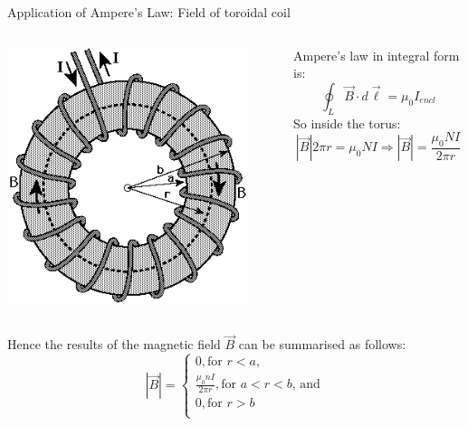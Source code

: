 \begin{frame}{Application of Ampere's Law: Field of toroidal coil}

\begin{columns}
  \begin{column}{0.33\textwidth}
    \begin{center}
     \includegraphics[width=0.90\textwidth]{./images/schematics/toroidal_coil_magnetic_field.png}\\
    \end{center}
  \end{column}
  \begin{column}{0.67\textwidth}
     Ampere's law in integral form is:
     \begin{equation*}
        \oint_{L} \vec{B} \cdot d\vec{\ell} = \mu_0 I_{encl}
     \end{equation*}
     So inside the torus:
     \begin{equation*}
         |\vec{B}| 2\pi r = \mu_0 N I \Rightarrow  |\vec{B}| = \frac{\mu_0 N I}{2\pi r}
     \end{equation*}

  \end{column}
\end{columns}

Hence the results of the magnetic field $\vec{B}$
can be summarised as follows:
    \begin{equation*}
      |\vec{B}| = \left\{ \begin{array}{l}
             0, \text{for $r < a$,} \\
             \frac{\mu_0 n I}{2\pi r}, \text{for $a < r < b$, and} \\
             0, \text{for $r > b$} \\
        \end{array} \right.
    \end{equation*}

\end{frame}


